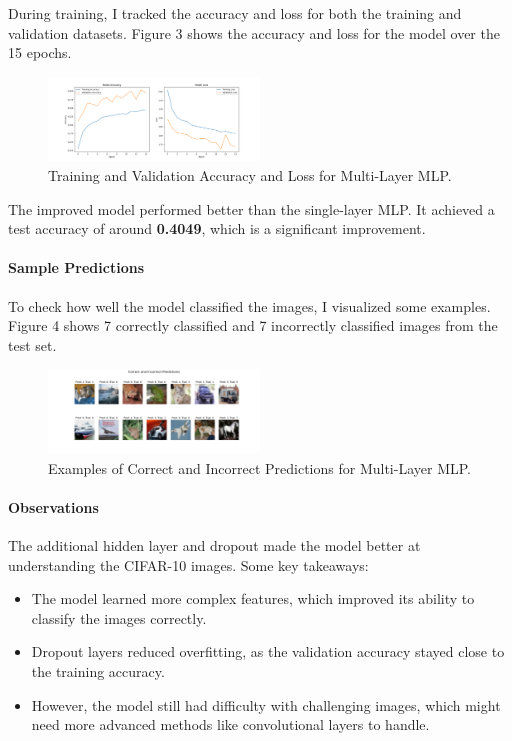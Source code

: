 \documentclass[lettersize,journal]{IEEEtran}
\begin{document}
During training, I tracked the accuracy and loss for both the training and validation datasets. Figure 3 shows the accuracy and loss for the model over the 15 epochs.

\begin{figure}[h!]
    \centering
    \includegraphics[width=0.5\textwidth]{training_history_MLP.png}
    \caption{Training and Validation Accuracy and Loss for Multi-Layer MLP.}
    \label{fig:mlp_training_history}
\end{figure}

The improved model performed better than the single-layer MLP. It achieved a test accuracy of around \textbf{0.4049}, which is a significant improvement.

\paragraph{\textbf{Sample Predictions}}

To check how well the model classified the images, I visualized some examples. Figure 4 shows 7 correctly classified and 7 incorrectly classified images from the test set.

\begin{figure}[h!]
    \centering
    \includegraphics[width=0.5\textwidth]{sample_predictions_MLP.png}
    \caption{Examples of Correct and Incorrect Predictions for Multi-Layer MLP.}
    \label{fig:mlp_predictions}
\end{figure}

\paragraph{\textbf{Observations}}

The additional hidden layer and dropout made the model better at understanding the CIFAR-10 images. Some key takeaways:
\begin{itemize}
    \item The model learned more complex features, which improved its ability to classify the images correctly.
    \item Dropout layers reduced overfitting, as the validation accuracy stayed close to the training accuracy.
    \item However, the model still had difficulty with challenging images, which might need more advanced methods like convolutional layers to handle.
\end{itemize}
\end{document}
